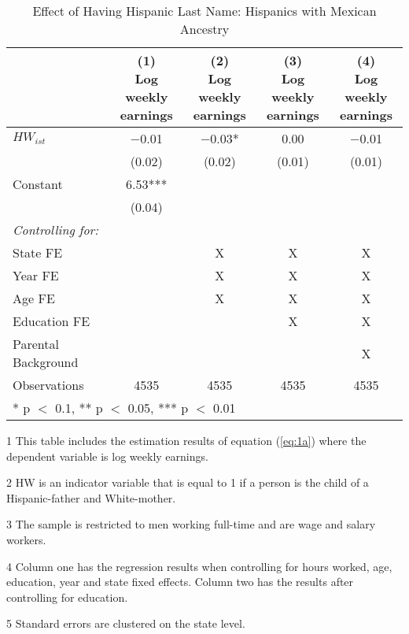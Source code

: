 \begin{table}[H]

\caption{Effect of Having Hispanic Last Name: Hispanics with Mexican Ancestry  \label{tab:lastnamereg-weekearm-mex}}
\centering
\begin{threeparttable}
\begin{tabular}[t]{lcccc}
\toprule
  & \specialcell{(1) \\ Log weekly \\ earnings} & \specialcell{(2) \\ Log weekly \\ earnings} & \specialcell{(3) \\  Log weekly \\ earnings} & \specialcell{(4) \\  Log weekly \\ earnings}\\
\midrule
$HW_{ist}$ & \num{-0.01} & \num{-0.03}* & \num{0.00} & \num{-0.01}\\
 & (\num{0.02}) & (\num{0.02}) & (\num{0.01}) & (\num{0.01})\\
Constant & \num{6.53}*** &  &  & \\
 & (\num{0.04}) &  &  & \\
\midrule
\textit{Controlling for:} &  &  &  & \\
State FE &  & X & X & X\\
Year FE &  & X & X & X\\
Age FE &  & X & X & X\\
Education FE &  &  & X & X\\
Parental Background &  &  &  & X\\
Observations & \num{4535} & \num{4535} & \num{4535} & \num{4535}\\
\bottomrule
\multicolumn{5}{l}{\rule{0pt}{1em}* p $<$ 0.1, ** p $<$ 0.05, *** p $<$ 0.01}\\
\end{tabular}
\begin{tablenotes}
\item[1] {\footnotesize{This table includes the estimation results of equation (\ref{eq:1a}) where the dependent variable is log weekly earnings.}}
\item[2] {\footnotesize{HW is an indicator variable that is equal to 1 if a person is the child of a Hispanic-father and White-mother.}}
\item[3] {\footnotesize{The sample is restricted to men working full-time and are wage and salary workers.}}
\item[4] {\footnotesize{Column one has the regression results when controlling for hours worked, age, education, year and state fixed effects. Column two has the results after controlling for education.}}
\item[5] {\footnotesize{Standard errors are clustered on the state level.}}
\end{tablenotes}
\end{threeparttable}
\end{table}
